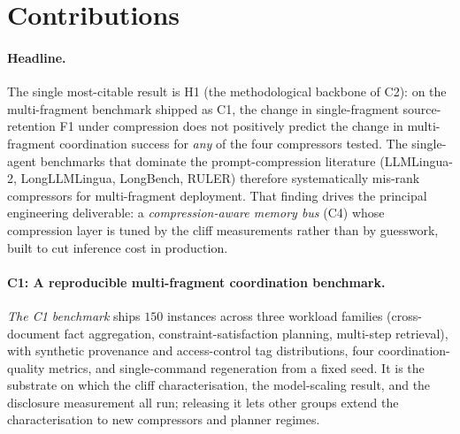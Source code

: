 \section{Contributions}
\label{sec:contributions}

\paragraph{Headline.}
The single most-citable result is H1 (the
methodological backbone of C2): on the multi-fragment benchmark
shipped as C1, the change in single-fragment source-retention F1
under compression does not positively predict the change in
multi-fragment coordination success for \emph{any} of the four
compressors tested. The single-agent benchmarks that dominate the
prompt-compression literature (LLMLingua-2, LongLLMLingua, LongBench,
RULER) therefore systematically mis-rank compressors for
multi-fragment deployment. That finding drives the principal engineering deliverable: a \emph{compression-aware memory bus} (C4)
whose compression layer is tuned by the cliff measurements rather
than by guesswork, built to cut inference cost in production.

\paragraph{C1: A reproducible multi-fragment coordination
benchmark.}
\emph{The C1 benchmark} ships $150$ instances across three
workload families (cross-document fact aggregation,
constraint-satisfaction planning, multi-step retrieval), with
synthetic provenance and access-control tag distributions, four
coordination-quality metrics, and single-command regeneration from a
fixed seed. It is the substrate on which the cliff characterisation,
the model-scaling result, and the disclosure measurement all run;
releasing it lets other groups extend the characterisation to new
compressors and planner regimes.

